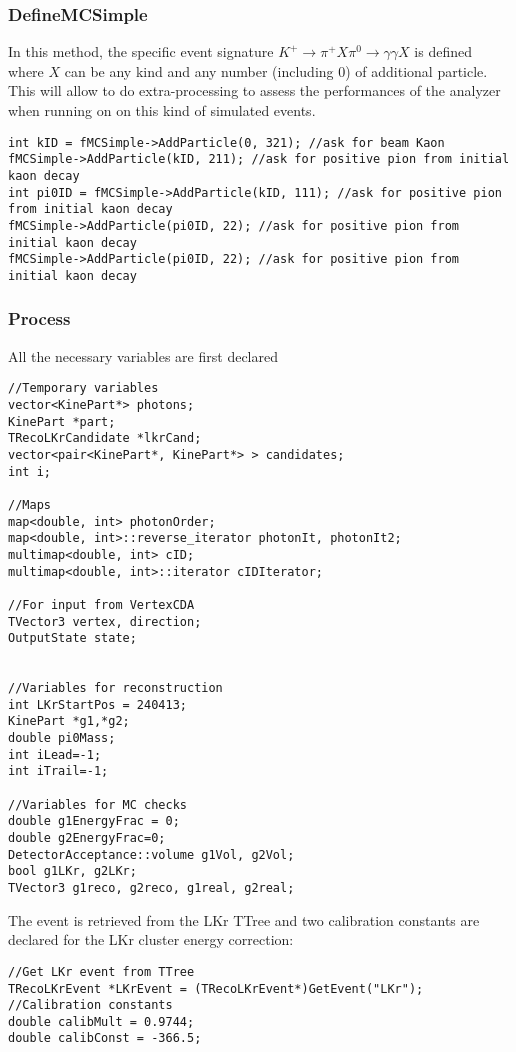 \subsubsection{DefineMCSimple}
In this method, the specific event signature $K^+\to\pi^+X\pi^0\to\gamma\gamma X$ is defined where
$X$ can be any kind and any number (including 0) of additional particle. This will allow to do
extra-processing to assess the performances of the analyzer when running on on this kind of
simulated events.
\begin{lstlisting}
int kID = fMCSimple->AddParticle(0, 321); //ask for beam Kaon
fMCSimple->AddParticle(kID, 211); //ask for positive pion from initial kaon decay
int pi0ID = fMCSimple->AddParticle(kID, 111); //ask for positive pion from initial kaon decay
fMCSimple->AddParticle(pi0ID, 22); //ask for positive pion from initial kaon decay
fMCSimple->AddParticle(pi0ID, 22); //ask for positive pion from initial kaon decay
\end{lstlisting}


\subsubsection{Process}
All the necessary variables are first declared
\begin{lstlisting}
//Temporary variables
vector<KinePart*> photons;
KinePart *part;
TRecoLKrCandidate *lkrCand;
vector<pair<KinePart*, KinePart*> > candidates;
int i;

//Maps
map<double, int> photonOrder;
map<double, int>::reverse_iterator photonIt, photonIt2;
multimap<double, int> cID;
multimap<double, int>::iterator cIDIterator;

//For input from VertexCDA
TVector3 vertex, direction;
OutputState state;


//Variables for reconstruction
int LKrStartPos = 240413;
KinePart *g1,*g2;
double pi0Mass;
int iLead=-1;
int iTrail=-1;

//Variables for MC checks
double g1EnergyFrac = 0;
double g2EnergyFrac=0;
DetectorAcceptance::volume g1Vol, g2Vol;
bool g1LKr, g2LKr;
TVector3 g1reco, g2reco, g1real, g2real;
\end{lstlisting}

The event is retrieved from the LKr TTree and two calibration constants are declared for the LKr
cluster energy correction:
\begin{lstlisting}
//Get LKr event from TTree
TRecoLKrEvent *LKrEvent = (TRecoLKrEvent*)GetEvent("LKr");
//Calibration constants
double calibMult = 0.9744;
double calibConst = -366.5;
\end{lstlisting}

